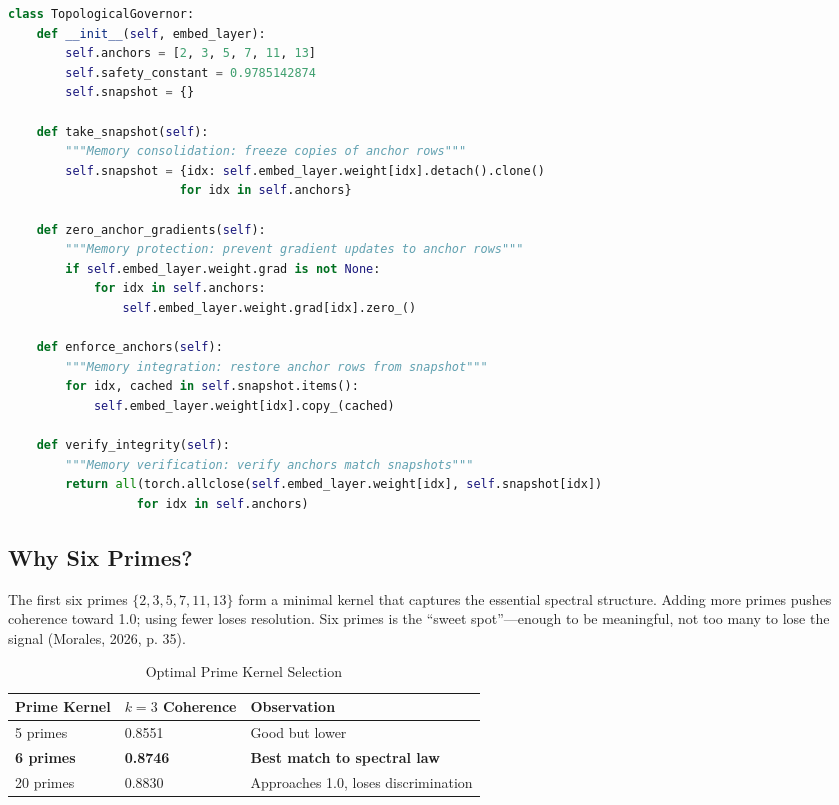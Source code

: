 \documentclass{article}
\begin{document}
\begin{lstlisting}[language=Python, caption=TopologicalGovernor Implementation]
class TopologicalGovernor:
    def __init__(self, embed_layer):
        self.anchors = [2, 3, 5, 7, 11, 13]
        self.safety_constant = 0.9785142874
        self.snapshot = {}
    
    def take_snapshot(self):
        """Memory consolidation: freeze copies of anchor rows"""
        self.snapshot = {idx: self.embed_layer.weight[idx].detach().clone() 
                        for idx in self.anchors}
    
    def zero_anchor_gradients(self):
        """Memory protection: prevent gradient updates to anchor rows"""
        if self.embed_layer.weight.grad is not None:
            for idx in self.anchors:
                self.embed_layer.weight.grad[idx].zero_()
    
    def enforce_anchors(self):
        """Memory integration: restore anchor rows from snapshot"""
        for idx, cached in self.snapshot.items():
            self.embed_layer.weight[idx].copy_(cached)
    
    def verify_integrity(self):
        """Memory verification: verify anchors match snapshots"""
        return all(torch.allclose(self.embed_layer.weight[idx], self.snapshot[idx])
                  for idx in self.anchors)
\end{lstlisting}

\subsection{Why Six Primes?}

The first six primes $\{2,3,5,7,11,13\}$ form a minimal kernel that captures the essential spectral structure. Adding more primes pushes coherence toward 1.0; using fewer loses resolution. Six primes is the ``sweet spot''---enough to be meaningful, not too many to lose the signal (Morales, 2026, p. 35).

\begin{table}[ht]
\centering
\caption{Optimal Prime Kernel Selection}
\begin{tabular}{lll}
\toprule
Prime Kernel & $k = 3$ Coherence & Observation \\
\midrule
5 primes & 0.8551 & Good but lower \\
\textbf{6 primes} & \textbf{0.8746} & \textbf{Best match to spectral law} \\
20 primes & 0.8830 & Approaches 1.0, loses discrimination \\
\bottomrule
\end{tabular}
\end{table}
\end{document}
